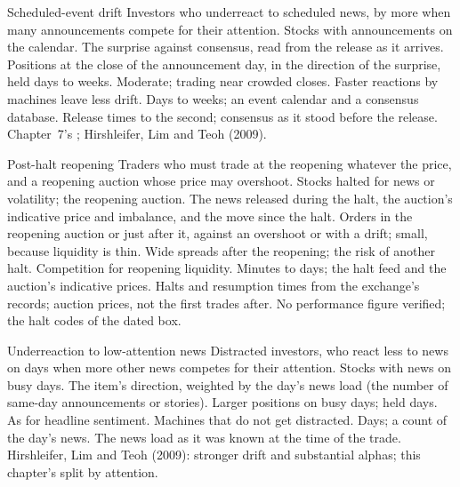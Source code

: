 \begin{strategyfile}{Scheduled-event drift}\label{strat:s1:news-and-events:scheduled}
 Investors who underreact to scheduled news, by more when many announcements compete for their attention.
 Stocks with announcements on the calendar.
 The surprise against consensus, read from the release as it arrives.
 Positions at the close of the announcement day, in the direction of the surprise, held days to weeks.
 Moderate; trading near crowded closes.
 Faster reactions by machines leave less drift.
 Days to weeks; an event calendar and a consensus database.
 Release times to the second; consensus as it stood before the release.
 Chapter~7's ; Hirshleifer, Lim and Teoh (2009).
\end{strategyfile}

\begin{strategyfile}{Post-halt reopening}\label{strat:s1:news-and-events:halt}
 Traders who must trade at the reopening whatever the price, and a reopening auction whose price may overshoot.
 Stocks halted for news or volatility; the reopening auction.
 The news released during the halt, the auction's indicative price and imbalance, and the move since the halt.
 Orders in the reopening auction or just after it, against an overshoot or with a drift; small, because liquidity is thin.
 Wide spreads after the reopening; the risk of another halt.
 Competition for reopening liquidity.
 Minutes to days; the halt feed and the auction's indicative prices.
 Halts and resumption times from the exchange's records; auction prices, not the first trades after.
 No performance figure verified; the halt codes of the dated box.
\end{strategyfile}

\begin{strategyfile}{Underreaction to low-attention news}\label{strat:s1:news-and-events:attention}
 Distracted investors, who react less to news on days when more other news competes for their attention.
 Stocks with news on busy days.
 The item's direction, weighted by the day's news load (the number of same-day announcements or stories).
 Larger positions on busy days; held days.
 As for headline sentiment.
 Machines that do not get distracted.
 Days; a count of the day's news.
 The news load as it was known at the time of the trade.
 Hirshleifer, Lim and Teoh (2009): stronger drift and substantial alphas; this chapter's split by attention.
\end{strategyfile}

